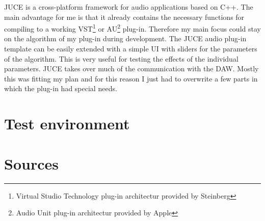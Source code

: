 JUCE is a cross-platform framework for audio applications based on C++. The main advantage for me is that it already contains the necessary functions for compiling to a working VST\footnote{Virtual Studio Technology plug-in architectur provided by Steinberg} or AU\footnote{Audio Unit plug-in architectur provided by Apple} plug-in. Therefore my main focus could stay on the algorithm of my plug-in during development. The JUCE audio plug-in template can be easily extended with a simple UI with sliders for the parameters of the algorithm. This is very useful for testing the effects of the individual parameters. JUCE takes over much of the communication with the DAW. Mostly this was fitting my plan and for this reason I just had to overwrite a few parts in which the plug-in had special needs.\\

\section{Test environment}

\section{Sources}
